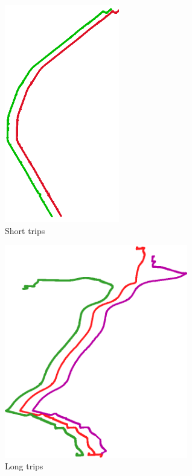 \begin{figure}[tb]
    \centering
    \includegraphics[width=50mm]{Pictures/ShortTrips.png}
    \caption{Short trips}
    \label{fig:shorttrips}
\end{figure}

\begin{figure}[tb]
    \centering
    \includegraphics[width=80mm]{Pictures/LongTrips.png}
    \caption{Long trips}
    \label{fig:longtrips}
\end{figure}


